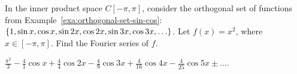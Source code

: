 \documentclass{ximera}
\begin{document}
\begin{exercise}
  In the inner product space $C[-\pi,\pi]$, consider the orthogonal
  set of functions from Example~\ref{exa:orthogonal-set-sin-cos}:
  $\left\{1, \sin x, \cos x, \sin 2x, \cos 2x, \sin 3x, \cos 3x, \ldots\right\}$.  Let
  $f(x) = x^2$, where $x\in[-\pi,\pi]$. Find the Fourier series of
  $f$.
  \begin{solution}
    $\frac{\pi^2}{3} - \frac{4}{1}\cos x + \frac{4}{4}\cos 2x - \frac{4}{9} \cos 3x + \frac{4}{16} \cos 4x - \frac{4}{25} \cos 5x \pm \ldots$.
  \end{solution}
\end{exercise}
\end{document}
